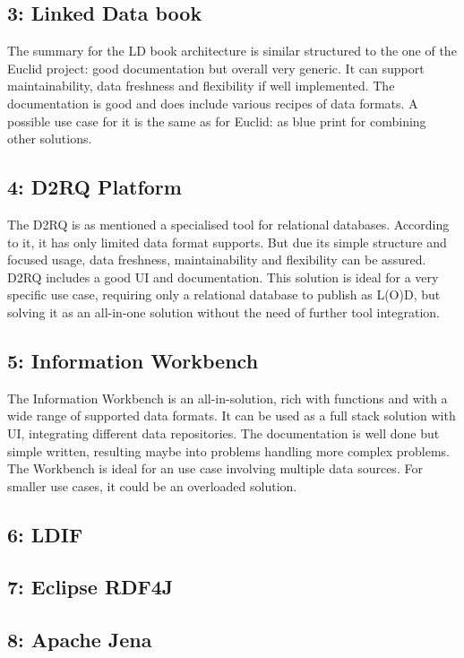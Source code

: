 \subsection*{3: Linked Data book}
The summary for the LD book architecture is similar structured to the one of the Euclid project: good documentation but overall very generic. It can support maintainability, data freshness and flexibility if well implemented. The documentation is good and does include various recipes of data formats.
A possible use case for it is the same as for Euclid: as blue print for combining other solutions.

\subsection*{4: D2RQ Platform}
The D2RQ is as mentioned a specialised tool for relational databases. According to it, it has only limited data format supports. But due its simple structure and focused usage, data freshness, maintainability and flexibility can be assured. D2RQ includes a good UI and documentation.
This solution is ideal for a very specific use case, requiring only a relational database to publish as L(O)D, but solving it as an all-in-one solution without the need of further tool integration.

\subsection*{5: Information Workbench}
The Information Workbench is an all-in-solution, rich with functions and with a wide range of supported data formats. It can be used as a full stack solution with UI, integrating different data repositories. The documentation is well done but simple written, resulting maybe into problems handling more complex problems.
The Workbench is ideal for an use case involving multiple data sources.  For smaller use cases, it could be an overloaded solution.

\subsection*{6: LDIF}

\subsection*{7: Eclipse RDF4J}

\subsection*{8: Apache Jena}